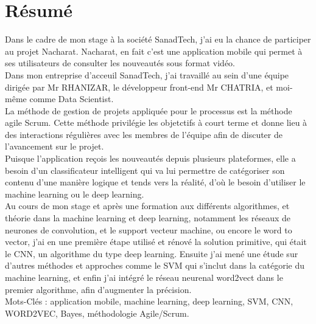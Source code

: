 \documentclass[11pt, oneside]{Thesis} %
\begin{document}
\chapter*{Résumé}
Dans le cadre de mon stage à la société SanadTech, j'ai eu la chance de participer au projet Nacharat. Nacharat, en fait c'est une application mobile qui permet à ses utilisateurs de consulter les nouveautés sous format vidéo.\\
Dans mon entreprise d'acceuil SanadTech, j'ai travaillé au sein d'une équipe dirigée par Mr RHANIZAR, le développeur front-end Mr CHATRIA, et moi-même comme Data Scientist.\\
La méthode de gestion de projets appliquée pour le processus est la méthode agile Scrum. Cette méthode privilégie les objetctifs à court terme et donne lieu à des interactions régulières avec les membres de l'équipe afin de discuter de l'avancement sur le projet.\\
Puisque l'application reçois les nouveautés depuis plusieurs plateformes, elle a besoin d'un classificateur intelligent qui va lui permettre de catégoriser son contenu d'une manière logique et tends vers la réalité, d'où le besoin d'utiliser le machine learning ou le deep learning.\\
Au cours de mon stage et après une formation aux différents algorithmes, et théorie dans la machine learning et deep learning, notamment les réseaux de neurones de convolution, et le support vecteur machine, ou encore le word to vector, j'ai en une première étape utilisé et rénové la solution primitive, qui était le CNN, un algorithme du type deep learning. Ensuite j'ai mené une étude sur d'autres méthodes et approches comme le SVM qui s'inclut dans la catégorie du machine learning, et enfin j'ai intégré le réseau neurenal word2vect dans le premier algorithme, afin d'augmenter la précision.\\[1cm]




Mots-Clés : application mobile, machine learning, deep learning, SVM, CNN, WORD2VEC, Bayes, méthodologie Agile/Scrum.



%

\clearpage %

\clearpage %
\end{document}
